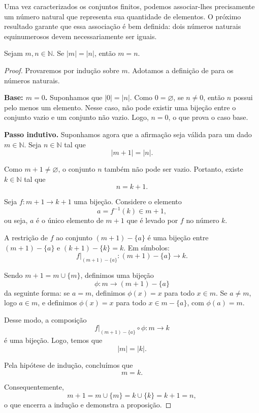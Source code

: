 Uma vez caracterizados os conjuntos finitos, podemos associar-lhes precisamente um número natural que representa sua quantidade de elementos. O próximo resultado garante que essa associação é bem definida: dois números naturais equinumerosos devem necessariamente ser iguais.

\begin{proposicao}
    \label{prop:unicidade_cardinalidade_naturais}
    Sejam \(m,n\in\mathbb{N}\). Se \(|m| = |n|\), então \(m=n\).
\end{proposicao}

\begin{proof}
    Provaremos por indução sobre \(m\). Adotamos a definição de \textcite{halmos2014} para os números naturais.

    \textbf{Base: \(m = 0\).} Suponhamos que \(|0| = |n|\). Como \(0 = \varnothing\), se \(n \neq 0\), então \(n\) possui pelo menos um elemento. Nesse caso, não pode existir uma bijeção entre o conjunto vazio e um conjunto não vazio. Logo, \(n = 0\), o que prova o caso base.

    \textbf{Passo indutivo.}
    Suponhamos agora que a afirmação seja válida para um dado \(m \in \mathbb{N}\).
    Seja \(n \in \mathbb{N}\) tal que
    \[
        |m+1| = |n|.
    \]

    Como \(m+1 \neq \varnothing\), o conjunto \(n\) também não pode ser vazio.
    Portanto, existe \(k \in \mathbb{N}\) tal que
    \[
        n = k+1.
    \]

    Seja \(f: m+1 \to k+1\) uma bijeção.
    Considere o elemento
    \[
        a = f^{-1}(k) \in m+1,
    \]
    ou seja, \(a\) é o único elemento de \(m+1\) que é levado por \(f\) no número \(k\).

    A restrição de \(f\) ao conjunto \((m+1) - \{a\}\) é uma bijeção entre \((m+1) - \{a\}\) e \((k+1) - \{k\} = k\).
    Em símbolos:
    \[
        f|_{(m+1) - \{a\}}: (m+1) - \{a\} \to k.
    \]

    Sendo \(m+1 = m \cup \{m\}\), definimos uma bijeção
    \[
        \phi: m \to (m+1) - \{a\}
    \]
    da seguinte forma: se \(a = m\), definimos \(\phi(x) = x\) para todo \(x \in m\). Se \(a \neq m\), logo \(a \in m\), e definimos \(\phi(x) = x\) para todo \(x \in m - \{a\}\), com \(\phi(a) = m\).

    Desse modo, a composição
    \[
        f|_{(m+1) - \{a\}} \circ \phi: m \to k
    \]
    é uma bijeção.
    Logo, temos que
    \[
        |m| = |k|.
    \]

    Pela hipótese de indução, concluímos que
    \[
        m = k.
    \]

    Consequentemente,
    \[
        m+1 = m \cup \{m\} = k \cup \{k\} = k+1 = n,
    \]
    o que encerra a indução e demonstra a proposição.
\end{proof}

